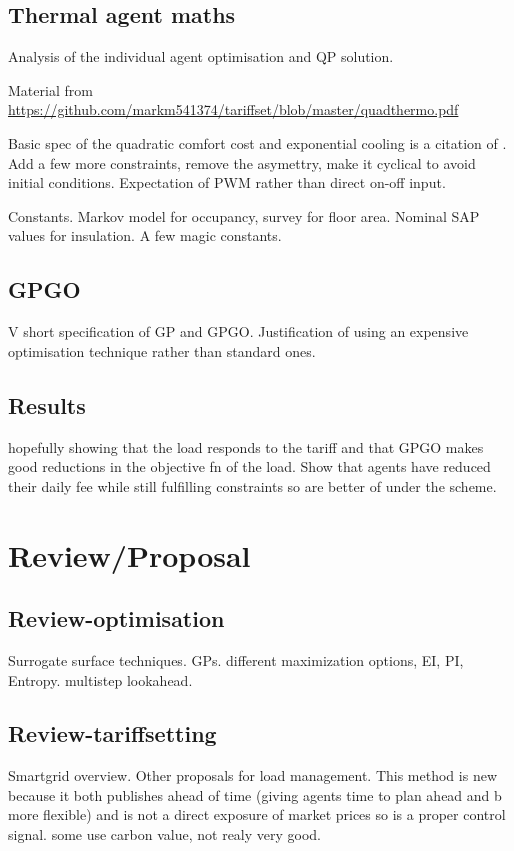 \documentclass[a4paper, 10 pt, conference]{ieeeconf}  %
\begin{document}
\subsection{Thermal agent maths}
Analysis of the individual agent optimisation and QP solution.

Material from \url{https://github.com/markm541374/tariffset/blob/master/quadthermo.pdf}

Basic spec of the quadratic comfort cost and exponential cooling is a citation of \cite{ramchurn2011agent}. Add a few more constraints, remove the asymettry, make it cyclical to avoid initial conditions. Expectation of PWM rather than direct on-off input.

Constants. Markov model for occupancy, survey for floor area. Nominal SAP values for insulation. A few magic constants.


\subsection{GPGO}
V short specification of GP and GPGO.
Justification of using an expensive optimisation technique rather than standard ones.
\subsection{Results}
hopefully showing that the load responds to the tariff and that GPGO makes good reductions in the objective fn of the load. Show that agents have reduced their daily fee while still fulfilling constraints so are better of under the scheme.

\section{Review/Proposal}

\subsection{Review-optimisation}
Surrogate surface techniques. GPs. different maximization options, EI, PI, Entropy. multistep lookahead.
\subsection{Review-tariffsetting}
Smartgrid overview. Other proposals for load management. This method is new because it both publishes ahead of time (giving agents time to plan ahead and b more flexible) and is not a direct exposure of market prices so is a proper control signal. some use carbon value, not realy very good.
\end{document}

